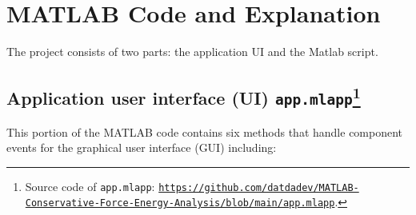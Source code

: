 \documentclass[13pt,a4paper]{report}
\begin{document}
\newpage
\section{MATLAB Code and Explanation}
The project consists of two parts: the application UI and the Matlab script.

\subsection{Application user interface (UI) \texttt{app.mlapp}\protect\footnote[6]{Source code of \texttt{app.mlapp}: \texttt{\url{https://github.com/datdadev/MATLAB-Conservative-Force-Energy-Analysis/blob/main/app.mlapp}}.}}

This portion of the MATLAB code contains six methods that handle component events for the graphical user interface (GUI) including:
\end{document}
